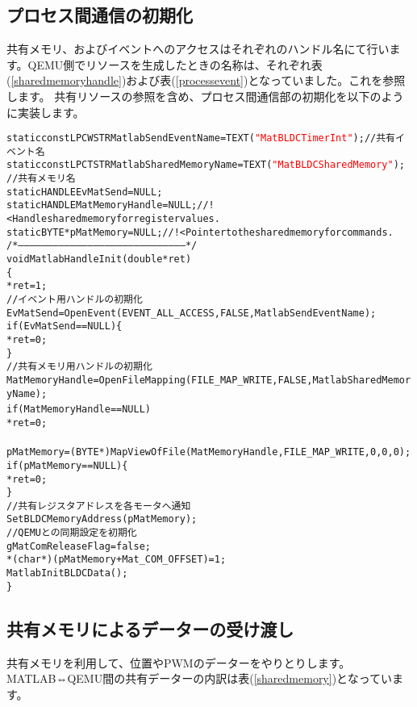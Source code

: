 \documentclass[uplatex,a4paper,twoside,10pt]{jsarticle}
\begin{document}
\subsection{プロセス間通信の初期化}
共有メモリ、およびイベントへのアクセスはそれぞれのハンドル名にて行います。QEMU側でリソースを生成したときの名称は、それぞれ表(\ref{sharedmemoryhandle})および表(\ref{processevent})となっていました。これを参照します。
共有リソースの参照を含め、プロセス間通信部の初期化を以下のように実装します。
{\small
\begin{alltt}
static const LPCWSTR MatlabSendEventName = TEXT(\textcolor{red}{"MatBLDCTimerInt"}); //共有イベント名
static const LPCTSTR MatlabSharedMemoryName = TEXT(\textcolor{red}{"MatBLDCSharedMemory"});　//共有メモリ名
static HANDLE   EvMatSend = NULL;
static HANDLE   MatMemoryHandle = NULL; //!< Handle shared memory for register values.
static BYTE     *pMatMemory = NULL;     //!< Pointer to the shared memory for commands.
/* -------------------------------------------------------------------------------------- */
void MatlabHandleInit(double *ret)
\{
    *ret = 1;
    //イベント用ハンドルの初期化
    EvMatSend = OpenEvent(EVENT_ALL_ACCESS, FALSE, MatlabSendEventName);
    if (EvMatSend == NULL) \{
        *ret = 0;
    \}
    //共有メモリ用ハンドルの初期化
    MatMemoryHandle = OpenFileMapping(FILE_MAP_WRITE, FALSE, MatlabSharedMemoryName);
    if (MatMemoryHandle == NULL) {
        *ret = 0;
    }
    pMatMemory = (BYTE*)MapViewOfFile(MatMemoryHandle, FILE_MAP_WRITE, 0, 0, 0);
    if (pMatMemory == NULL) \{
        *ret = 0;
    \}
    //共有レジスタアドレスを各モータへ通知
    SetBLDCMemoryAddress(pMatMemory);
    //QEMUとの同期設定を初期化
    gMatComReleaseFlag = false;
    *(char*)(pMatMemory + Mat_COM_OFFSET) = 1;
    MatlabInitBLDCData();
\}
\end{alltt}}

\subsection{共有メモリによるデーターの受け渡し}
共有メモリを利用して、位置やPWMのデーターをやりとりします。MATLAB⇔QEMU間の共有データーの内訳は表(\ref{sharedmemory})となっています。
\end{document}
